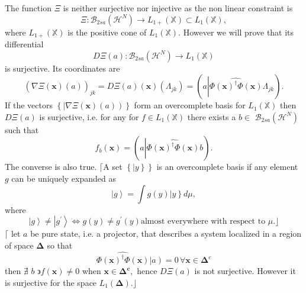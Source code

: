 \documentclass[aps,preprint]{revtex4}%
\begin{document}
The function $\Xi$ is neither surjective nor injective as the non linear
constraint is
\begin{equation}
\Xi:\mathcal{B}_{2sa}\left(  \mathcal{H}^{N}\right)  \rightarrow L_{1+}\left(
\mathbb{X}\right)  \subset L_{1}\left(  \mathbb{X}\right)  ,
\end{equation}
where $L_{1+}\left(  \mathbb{X}\right)  $ is the positive cone of
$L_{1}\left(  \mathbb{X}\right)  .$ However we will prove that its
differential
\begin{equation}
D\Xi\left(  a\right)  :\mathcal{B}_{2sa}\left(  \mathcal{H}^{N}\right)
\rightarrow L_{1}\left(  \mathbb{X}\right)
\end{equation}
is surjective. Its coordinates are
\begin{equation}
\left(  \overset{}{\nabla\Xi\left(  \mathbf{x}\right)  \left(  a\right)
}\right)  _{jk}=D\Xi\left(  a\right)  \left(  \mathbf{x}\right)  \left(
\Lambda_{jk}\right)  =\left(  a\left\vert \widehat{\Phi\left(  \mathbf{x}%
\right)  ^{\dagger}\Phi\left(  \mathbf{x}\right)  }\right.  \Lambda
_{jk}\right)  .
\end{equation}
If the vectors $\left\{  \left\vert \nabla\Xi\left(  \mathbf{x}\right)
\left(  a\right)  \right)  \right\}  $ form an overcomplete basis for
$L_{1}\left(  \mathbb{X}\right)  $ then $D\Xi\left(  a\right)  $ is
surjective, i.e. for any for $f\in L_{1}\left(  \mathbb{X}\right)  $ there
exists a $b\in$ $\mathcal{B}_{2sa}\left(  \mathcal{H}^{N}\right)  $ such that
\begin{equation}
f_{b}\left(  \mathbf{x}\right)  =\left(  a\left\vert \widehat{\Phi\left(
\mathbf{x}\right)  ^{\dagger}\Phi\left(  \mathbf{x}\right)  }\right.
b\right)  \mathbf{.}%
\end{equation}
The converse is also true. $\lceil$A set $\left\{  \left\vert y\right\}
\right\}  $ is an overcomplete basis if any element $g$ can be uniquely
expanded as
\begin{equation}
\left\vert g\right\rangle =\int g\left(  y\right)  \left\vert y\right\}  d\mu,
\end{equation}
where
\begin{equation}
\left\vert g\right\rangle \neq\left\vert g^{\prime}\right\rangle
\Leftrightarrow g\left(  y\right)  \neq g^{\prime}\left(  y\right)  \text{
almost everywhere with respect to }\mu.\rfloor
\end{equation}
$\lceil$ let $a$ be pure state, i.e. a projector, that describes a system
localized in a region of space $\mathbf{\Delta}$ so that
\begin{equation}
\widehat{\Phi\left(  \mathbf{x}\right)  ^{\dagger}\Phi\left(  \mathbf{x}%
\right)  }\left\vert \overset{}{a}\right)  =0\,\forall\mathbf{x\in\Delta}^{c}%
\end{equation}
then $\nexists$ $b$ $\backepsilon f\left(  \mathbf{x}\right)  \neq0$ when
$\mathbf{x\in\mathbf{\Delta}^{c},}$ hence $D\Xi\left(  a\right)  $ is not
surjective. However it is surjective for the space $L_{1}\left(
\mathbf{\Delta}\right)  .\mathbf{\rfloor}$
\end{document}
